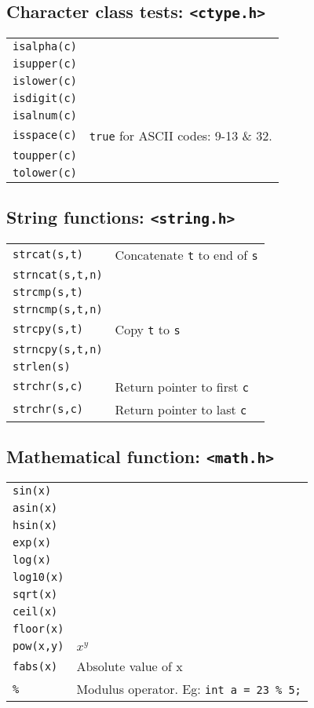 \begin{multicols*}{3}
\subsection{Character class tests: \texttt{<ctype.h>}}
\begin{tabularx}{\linewidth}{lX}
\texttt{isalpha(c)} &\\
\texttt{isupper(c)} &\\
\texttt{islower(c)} &\\
\texttt{isdigit(c)} &\\
\texttt{isalnum(c)} & \\
\texttt{isspace(c)} & \texttt{true} for ASCII codes: 9-13 \& 32.\\
\texttt{toupper(c)} &\\
\texttt{tolower(c)} &\\
\end{tabularx}

\subsection{String functions: \texttt{<string.h>}}
\begin{tabularx}{\linewidth}{lX}
\texttt{strcat(s,t)} & Concatenate \texttt{t} to end of \texttt{s}\\
\texttt{strncat(s,t,n)}  & \\
\texttt{strcmp(s,t)} & \\
\texttt{strncmp(s,t,n)} & \\
\texttt{strcpy(s,t)} & Copy \texttt{t} to \texttt{s}\\
\texttt{strncpy(s,t,n)} & \\
\texttt{strlen(s)} & \\
\texttt{strchr(s,c)} & Return pointer to first \texttt{c}\\
\texttt{strchr(s,c)} & Return pointer to last \texttt{c}\\
\end{tabularx}


\subsection{Mathematical function: \texttt{<math.h>}}
\begin{tabularx}{\linewidth}{lX}
\texttt{sin(x)} & \\
\texttt{asin(x)} & \\
\texttt{hsin(x)} & \\
\texttt{exp(x)} & \\
\texttt{log(x)} & \\
\texttt{log10(x)} & \\
\texttt{sqrt(x)} & \\
\texttt{ceil(x)} & \\
\texttt{floor(x)} & \\
\texttt{pow(x,y)} & $x^y$\\
\texttt{fabs(x)} & Absolute value of x\\
\texttt{\%} & Modulus operator. Eg: \texttt{int a = 23 \% 5;}\\
\end{tabularx}


\end{multicols*}
